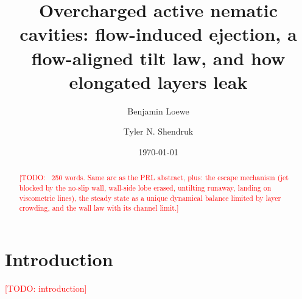 \documentclass[aps,pre,twocolumn,superscriptaddress,amsmath,amssymb,reprint]{revtex4-2}
\newcommand{\todo}[1]{\textcolor{red}{[TODO: #1]}}
\begin{document}
\title{Overcharged active nematic cavities: flow-induced ejection, a flow-aligned tilt law, and how elongated layers leak}
\author{Benjamin Loewe}
\author{Tyler N. Shendruk}
\date{\today}

\begin{abstract}
\todo{~250 words. Same arc as the PRL abstract, plus: the escape mechanism (jet blocked by the no-slip wall, wall-side lobe erased, untilting runaway, landing on
viscometric lines), the steady state as a unique dynamical balance limited by layer crowding, and the wall law with its channel limit.}
\end{abstract}
\maketitle

\section{Introduction}\label{sec:intro}
\todo{introduction}

\end{document}
